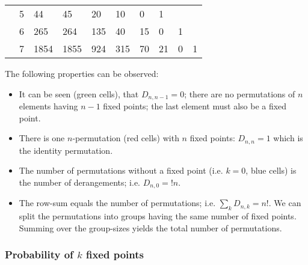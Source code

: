 \begin{table}[H]
\begin{tabular}{|ll|llllllll|}
                   & 5 & {\cellcolor[rgb]{0.208,0.518,0.894}}44   & 45                                    & 20                                    & 10                                    & {\cellcolor[rgb]{0.2,0.82,0.478}}0    & {\cellcolor[rgb]{0.878,0.106,0.141}}1 &                                       &                                        \\
                   & 6 & {\cellcolor[rgb]{0.208,0.518,0.894}}265  & 264                                   & 135                                   & 40                                    & 15                                    & {\cellcolor[rgb]{0.2,0.82,0.478}}0    & {\cellcolor[rgb]{0.878,0.106,0.141}}1 &                                        \\
                   & 7 & {\cellcolor[rgb]{0.208,0.518,0.894}}1854 & 1855                                  & 924                                   & 315                                   & 70                                    & 21                                    & {\cellcolor[rgb]{0.2,0.82,0.478}}0    & {\cellcolor[rgb]{0.878,0.106,0.141}}1  \\
\hline
\end{tabular}
\end{table}


The following properties can be observed:

\begin{itemize}
\item  It can be seen (green cells), that $D_{n,n-1} = 0$; there are no permutations of $n$ elements having $n-1$ fixed points; the last element must also be a fixed point.
\item  There is one $n$-permutation (red cells) with $n$ fixed points: $D_{n,n} = 1$ which is the identity permutation.
\item  The number of permutations without a fixed point (i.e. $k=0$, blue cells) is the number of derangements; i.e. $D_{n,0} = !n$.
\item  The row-sum equals the number of permutations; i.e. $\sum_{k} D_{n,k} = n!$. We can split the permutations into groups having the same number of fixed points. Summing over the group-sizes yields the total number of permutations.
\end{itemize}

\subsubsection{Probability of $k$ fixed points}

